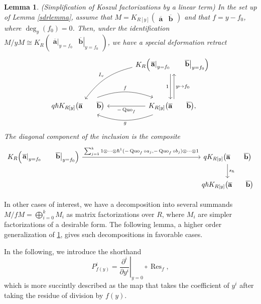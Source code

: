 \documentclass{article}
\DeclareMathOperator{\Res}{Res}
\DeclareMathOperator{\Quo}{Quo}
\newcommand{\kmf}[2]{
	K_{#1}{\begin{pmatrix}
			#2
		\end{pmatrix}
	}	
}
\theoremstyle{plain} %
\newtheorem{lemma}[theorem]{Lemma}
\theoremstyle{definition} %
\theoremstyle{remark} %
\begin{document}
\begin{lemma}\label{lemma:sdrkoszullinear} \emph{(Simplification of Koszul factorizations by a linear term)}
	In the set up of Lemma \ref{sdrlemma}, assume that $M=\kmf{R[y]}{\mathbf{\overline a} &\mathbf{\overline b}}$
	and that 
	$f=y-f_0$, where $\deg_y(f_0)=0$. Then, under the identification 
	$M/yM\cong \kmf{R}{\left.\mathbf{\overline a}\right|_{y=f_0} & \left.\mathbf{\overline b}\right|_{y=f_0}}$,
	we have a special deformation retract
	$$
	\begin{tikzcd}[column sep=large]
		&
		\kmf{R}{\left.\mathbf{\overline a}\right|_{y=f_0} & \left.\mathbf{\overline b}\right|_{y=f_0}}
		\ar[dd, shift right=0.6ex, "1", swap]
		\ar[dd, leftarrow, shift left=0.6ex, "y\mapsto f_0"]
		\arrow[ddl, "{I_v}", bend right=20, swap]
		\\\\
		q\hslash\kmf{R[y]}{\mathbf{\overline a} & \mathbf{\overline b}}
		\arrow[r, "f", shift left=0.5ex, bend left=20]
		& 
		 \kmf{R[y]}{\mathbf{\overline a} & \mathbf{\overline b}}
		\ar[l, "-\Quo_f"]
		\arrow[l, "g", shift left=0.5ex, bend left=20], 
	\end{tikzcd}
	$$
	The diagonal component of the inclusion is the composite
	$$
	\begin{tikzcd}[column sep=6cm]
		\kmf{R}{\left.\mathbf{\overline a}\right|_{y=f_0} & \left.\mathbf{\overline b}\right|_{y=f_0}} 
		\arrow[r, "{\sum_{j=1}^k1\otimes\cdots \otimes\hslash^1(-\Quo_f\circ a_j,-\Quo_f\circ b_j)\otimes\cdots\otimes 1}"] 
		&
		q\kmf{R[y]}{\mathbf{\overline a} & \mathbf{\overline b}}
		\arrow[d,"s_\hslash"] 	
		\\
		&
		q\hslash\kmf{R[y]}{\mathbf{\overline a} & \mathbf{\overline b}}
	\end{tikzcd}
	$$
\end{lemma}



In other cases of interest, we have a decomposition into several summands $M/fM=\bigoplus_{i=0}^{k}M_i$ as matrix factorizations over $R$, where $M_i$ are simpler factorizations of a desirable form. The following lemma, a higher order generalization of \ref{lemma:sdrkoszullinear}, gives such decompositions in favorable cases.

In the following, we introduce the shorthand
$$
P_{f(y)}^i
= 
\left.\frac{\partial^i}{\partial y^i}\right|_{y=0}\circ\Res_f,
$$
which is more succintly described as the map that takes the coefficient of $y^i$ after taking the residue of division by $f(y)$. 
\end{document}
